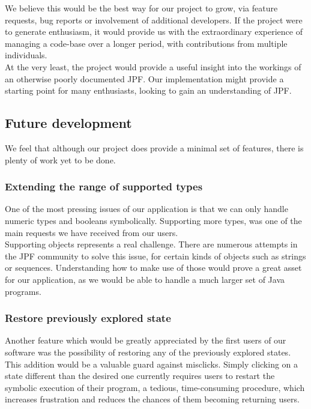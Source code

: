 \documentclass[titlepage,11pt]{article}
\begin{document}
We believe this would be the best way for our project to grow, via feature requests, bug reports or involvement of additional developers. If the project were to generate enthusiasm, it would provide us with the extraordinary experience of managing a code-base over a longer period, with contributions from multiple individuals. \\

At the very least, the project would provide a useful insight into the workings of an otherwise poorly documented JPF. Our implementation might provide a starting point for many enthusiasts, looking to gain an understanding of JPF.

\subsection{Future development}

We feel that although our project does provide a minimal set of features, there is plenty of work yet to be done.

\subsubsection{Extending the range of supported types}

One of the most pressing issues of our application is that we can only handle numeric types and booleans symbolically. Supporting more types, was one of the main requests we have received from our users. \\

\noindent Supporting objects represents a real challenge. There are numerous attempts in the JPF community to solve this issue, for certain kinds of objects such as strings or sequences. Understanding how to make use of those would prove a great asset for our application, as we would be able to handle a much larger set of Java programs.

\subsubsection{Restore previously explored state}

Another feature which would be greatly appreciated by the first users of our software was the possibility of restoring any of the previously explored states. This addition would be a valuable guard against misclicks. Simply clicking on a state different than the desired one currently requires users to restart the symbolic execution of their program, a tedious, time-consuming procedure, which increases frustration and reduces the chances of them becoming returning users. \\
\end{document}
